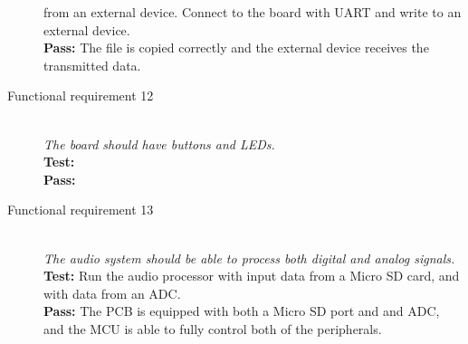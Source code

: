 \begin{description}
        from an external device. Connect to the board with UART and write to an external device.\\
        \textbf{Pass:} The file is copied correctly and the external device receives the 
        transmitted data. \\
    \item[Functional requirement 12] \hfill \\
        \textit{The board should have buttons and LEDs.} \\
        \textbf{Test:} \\
        \textbf{Pass:} \\
    \item[Functional requirement 13] \hfill \\
        \textit{The audio system should be able to process both digital and analog signals.} \\
        \textbf{Test:} Run the audio processor with input data from a Micro SD card, and
        with data from an ADC. \\
        \textbf{Pass:} The PCB is equipped with both a Micro SD port and and ADC, and the
        MCU is able to fully control both of the peripherals.\\
\end{description}
